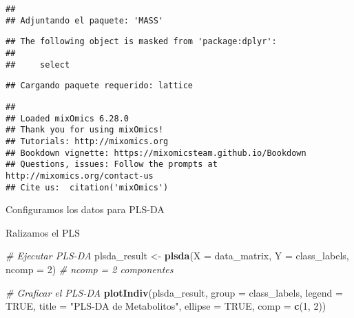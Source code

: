 \documentclass[
]{article}
\newenvironment{Shaded}{\begin{snugshade}}{\end{snugshade}}
\newcommand{\AttributeTok}[1]{\textcolor[rgb]{0.13,0.29,0.53}{#1}}
\newcommand{\CommentTok}[1]{\textcolor[rgb]{0.56,0.35,0.01}{\textit{#1}}}
\newcommand{\ConstantTok}[1]{\textcolor[rgb]{0.56,0.35,0.01}{#1}}
\newcommand{\DecValTok}[1]{\textcolor[rgb]{0.00,0.00,0.81}{#1}}
\newcommand{\FunctionTok}[1]{\textcolor[rgb]{0.13,0.29,0.53}{\textbf{#1}}}
\newcommand{\NormalTok}[1]{#1}
\newcommand{\OtherTok}[1]{\textcolor[rgb]{0.56,0.35,0.01}{#1}}
\newcommand{\SpecialCharTok}[1]{\textcolor[rgb]{0.81,0.36,0.00}{\textbf{#1}}}
\newcommand{\StringTok}[1]{\textcolor[rgb]{0.31,0.60,0.02}{#1}}
\begin{document}
\begin{verbatim}
## 
## Adjuntando el paquete: 'MASS'
\end{verbatim}

\begin{verbatim}
## The following object is masked from 'package:dplyr':
## 
##     select
\end{verbatim}

\begin{verbatim}
## Cargando paquete requerido: lattice
\end{verbatim}

\begin{verbatim}
## 
## Loaded mixOmics 6.28.0
## Thank you for using mixOmics!
## Tutorials: http://mixomics.org
## Bookdown vignette: https://mixomicsteam.github.io/Bookdown
## Questions, issues: Follow the prompts at http://mixomics.org/contact-us
## Cite us:  citation('mixOmics')
\end{verbatim}

Configuramos los datos para PLS-DA

\begin{Shaded}
\end{Shaded}

Ralizamos el PLS

\begin{Shaded}
\begin{Highlighting}[]
\CommentTok{\# Ejecutar PLS{-}DA}
\NormalTok{plsda\_result }\OtherTok{\textless{}{-}} \FunctionTok{plsda}\NormalTok{(}\AttributeTok{X =}\NormalTok{ data\_matrix, }\AttributeTok{Y =}\NormalTok{ class\_labels, }\AttributeTok{ncomp =} \DecValTok{2}\NormalTok{)  }\CommentTok{\# ncomp = 2 componentes}

\CommentTok{\# Graficar el PLS{-}DA}
\FunctionTok{plotIndiv}\NormalTok{(plsda\_result, }\AttributeTok{group =}\NormalTok{ class\_labels, }\AttributeTok{legend =} \ConstantTok{TRUE}\NormalTok{, }
          \AttributeTok{title =} \StringTok{"PLS{-}DA de Metabolitos"}\NormalTok{, }\AttributeTok{ellipse =} \ConstantTok{TRUE}\NormalTok{, }\AttributeTok{comp =} \FunctionTok{c}\NormalTok{(}\DecValTok{1}\NormalTok{, }\DecValTok{2}\NormalTok{))}
\end{Highlighting}
\end{Shaded}
\end{document}
